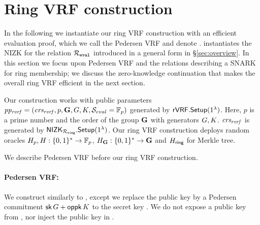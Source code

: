 
\def\tmpaux{\aux \doubleplus \piring \doubleplus \comring}
\def\tmpeprintaux{\eprint{\aux'}{\tmpaux}}
\def\tmpindent{\hspace*{5pt}}
\section{Ring VRF construction}%
\label{sec:pederson_vrf}

In the following we instantiate our ring VRF construction with an efficient evaluation proof, which
we call the Pedersen VRF and denote \PedVRF.
\PedVRF instantiates the NIZK for the relation $\mathcal{R}_{\mathtt{eval}}$ introduced in a general form 
in \S\ref{sec:overview}. In this section we focus upon Pedersen VRF and the relations 
describing a SNARK for ring membership; we discuss the zero-knowledge continuation
that makes the overall ring VRF efficient in the next section.

Our construction works with public parameters $ \mathit{pp_{\mathit{rvrf}}} = (\mathit{crs_{\mathit{rvrf}}}, p,{\mathbf{G}}, G,K, {\mathcal{S}}_{eval}  = \mathbb{F}_p)$ generated by $ {\mathsf{rVRF}}.{\mathsf{Setup}}(1^\lambda) $. Here, $ p $ is a prime number and the order of the group $ {\mathbf{G}} $ with generators $ G,K $.  $ \mathit{crs_{\mathit{rvrf}}} $ is  generated by $ {\mathsf{NIZK}}_{\mathcal{R}_{\mathtt{ring}}}.{\mathsf{Setup}}(1^\lambda) $. Our ring VRF construction deploys random oracles $H_p,H: \{0,1\}^* \to \mathbb{F}_p$, $H_{{\mathbf{G}}}: \{0,1\}^* \to {\mathbf{G}}$ and $ H_{\mathsf{ring}} $ for Merkle tree.

We  describe Pedersen VRF before  our ring VRF construction.
\paragraph{Pedersen VRF:} 
We construct \PedVRF similarly to 
\cite{nsec5,VXEd25519,draft-irtf-cfrg-vrf-10},
except we replace the public key by a Pedersen commitment
$\mathsf{sk} \, G + \mathsf{oppk} \, K$ to the secret key \sk.
We do not expose a public key from \KeyGen, nor inject the public key in \Eval.


